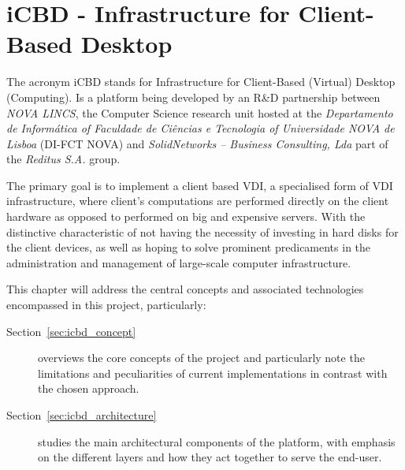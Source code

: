 

\chapter{iCBD - Infrastructure for Client-Based Desktop}
\label{cha:icbd}

The acronym \gls{iCBD} stands for Infrastructure for Client-Based (Virtual) Desktop (Computing). Is a platform being developed by an R\&D partnership between \textit{NOVA LINCS}, the Computer Science research unit hosted at the \textit{Departamento de Informática of Faculdade de Ciências e Tecnologia of Universidade NOVA de Lisboa} (DI-FCT NOVA) and \textit{SolidNetworks – Business Consulting, Lda} part of the \textit{Reditus S.A.} group. 

The primary goal is to implement a client based VDI, a specialised form of \gls{VDI} infrastructure, where client's computations are performed directly on the client hardware as opposed to performed on big and expensive servers. With the distinctive characteristic of not having the necessity of investing in hard disks for the client devices, as well as hoping to solve prominent predicaments in the administration and management of large-scale computer infrastructure.

This chapter will address the central concepts and associated technologies encompassed in this project, particularly:

\begin{description}
	\item [Section~\ref{sec:icbd_concept}] overviews the core concepts of the project and particularly note the limitations and peculiarities of current implementations in contrast with the chosen approach.
	\item [Section~\ref{sec:icbd_architecture}] studies the main architectural components of the platform, with emphasis on the different layers and how  they act together to serve the end-user.
\end{description}
\newpage


